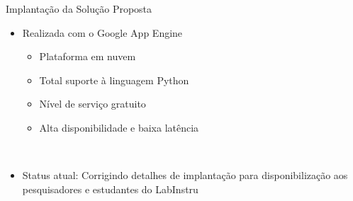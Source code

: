 \begin{frame}{Implantação da Solução Proposta}
\begin{itemize}
	\item Realizada com o \alert{Google App Engine}
	\begin{itemize}
		\item Plataforma em nuvem
		\item Total suporte à linguagem Python
		\item Nível de serviço gratuito
		\item Alta disponibilidade e baixa latência
	\end{itemize}
	\ \ \newline
	\item \alert{Status atual}: Corrigindo detalhes de implantação para disponibilização aos pesquisadores e estudantes do LabInstru
\end{itemize}
\end{frame}
